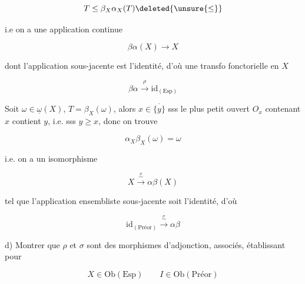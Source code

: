 \[
T\leq\beta_X\alpha_X(T)\deleted{\unsure{\leq}}
\]

i.e on a une application continue

\[
\beta\alpha(X)\longrightarrow X
\]

dont l'application sous-jacente est l'identité, d'où une transfo fonctorielle en $X$

\[
\beta\alpha\xrightarrow{\rho}\mathrm{id}_{(\mathrm{Esp})}
\]

Soit $\omega\in\underline\omega(X)$,  $T=\beta_X(\omega)$, alors $x\in\overline{\{y\}}$ sss
le plus petit ouvert $O_x$ contenant $x$ contient $y$, i.e. sss $y\geq x$, donc on trouve

\[
\alpha_X\beta_X(\omega)=\omega
\]

i.e. on a un isomorphisme

\[
X\xrightarrow{\overset{\sigma}{\sim}}\alpha\beta(X)
\]

tel que l'application ensembliste sous-jacente soit l'identité, d'où

\[
\mathrm{id}_{(\mathrm{Préor})}\xrightarrow{\overset{\sigma}{\sim}}\alpha\beta
\]

d) Montrer que $\rho$ et $\sigma$ sont des morphismes d'adjonction, associés,
établissant pour

\[
X\in\mathrm{Ob}(\mathrm{Esp})\qquad I\in\mathrm{Ob}(\mathrm{Préor})
\]
